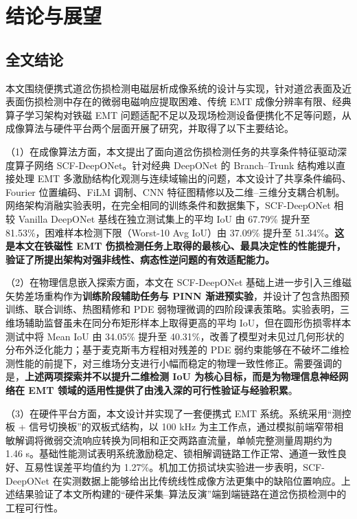 \chapter{结论与展望}

\section{全文结论}

本文围绕便携式道岔伤损检测电磁层析成像系统的设计与实现，针对道岔表面及近表面伤损检测中存在的微弱电磁响应提取困难、传统 EMT 成像分辨率有限、经典算子学习架构对铁磁 EMT 问题适配不足以及现场检测设备便携化不足等问题，从成像算法与硬件平台两个层面开展了研究，并取得了以下主要结论。

（1）在成像算法方面，本文提出了面向道岔伤损检测任务的共享条件特征驱动深度算子网络 SCF-DeepONet。针对经典 DeepONet 的 Branch--Trunk 结构难以直接处理 EMT 多激励结构化观测与连续域输出的问题，本文设计了共享条件编码、Fourier 位置编码、FiLM 调制、CNN 特征图精修以及二维--三维分支耦合机制。网络架构消融实验表明，在完全相同的训练条件和数据集下，SCF-DeepONet 相较 Vanilla DeepONet 基线在独立测试集上的平均 IoU 由 67.79\% 提升至 81.53\%，困难样本检测下限（Worst-10 Avg IoU）由 37.09\% 提升至 51.34\%。\textbf{这是本文在铁磁性 EMT 伤损检测任务上取得的最核心、最具决定性的性能提升，验证了所提出架构对强非线性、病态性逆问题的有效适配能力。}

（2）在物理信息嵌入探索方面，本文在 SCF-DeepONet 基础上进一步引入三维磁矢势差场重构作为\textbf{训练阶段辅助任务与 PINN 渐进预实验}，并设计了包含热图预训练、联合训练、热图精修和 PDE 弱物理微调的四阶段课表策略。实验表明，三维场辅助监督虽未在同分布矩形样本上取得更高的平均 IoU，但在圆形伤损零样本测试中将 Mean IoU 由 34.05\% 提升至 40.31\%，改善了模型对未见过几何形状的分布外泛化能力；基于麦克斯韦方程相对残差的 PDE 弱约束能够在不破坏二维检测性能的前提下，对三维场分支进行小幅而稳定的物理一致性修正。需要强调的是，\textbf{上述两项探索并不以提升二维检测 IoU 为核心目标，而是为物理信息神经网络在 EMT 领域的适用性提供了由浅入深的可行性验证与经验积累}。

（3）在硬件平台方面，本文设计并实现了一套便携式 EMT 系统。系统采用“测控板 + 信号切换板”的双板式结构，以 100 kHz 为主工作点，通过模拟前端窄带相敏解调将微弱交流响应转换为同相和正交两路直流量，单帧完整测量周期约为 1.46 s。基础性能测试表明系统激励稳定、锁相解调链路工作正常、通道一致性良好、互易性误差平均值约为 1.27\%。机加工仿损试块实验进一步表明，SCF-DeepONet 在实测数据上能够给出比传统线性成像方法更集中的缺陷位置响应。上述结果验证了本文所构建的“硬件采集--算法反演”端到端链路在道岔伤损检测中的工程可行性。

